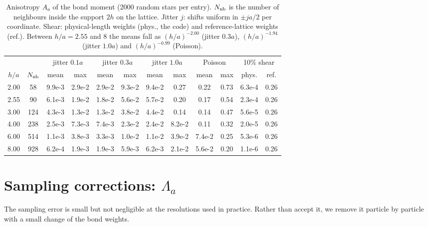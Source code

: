 \documentclass[11pt,aps,preprint,nofootinbib,superscriptaddress,tightenlines]{revtex4-2}
\begin{document}
\begin{table}[t]
\centering
\begin{tabular}{c c | c c | c c | c c | c c | c c}
\hline\hline
 & & \multicolumn{2}{c|}{jitter $0.1a$} & \multicolumn{2}{c|}{jitter $0.3a$} &
 \multicolumn{2}{c|}{jitter $1.0a$} & \multicolumn{2}{c|}{Poisson} & \multicolumn{2}{c}{10\% shear}\\
$h/a$ & $N_{\rm nb}$ & mean & max & mean & max & mean & max & mean & max & phys. & ref.\\
\hline
2.00 & 58  & 9.9e-3 & 2.9e-2 & 2.9e-2 & 9.3e-2 & 9.4e-2 & 0.27 & 0.22 & 0.73 & 6.3e-4 & 0.26\\
2.55 & 90  & 6.1e-3 & 1.9e-2 & 1.8e-2 & 5.6e-2 & 5.7e-2 & 0.20 & 0.17 & 0.54 & 2.3e-4 & 0.26\\
3.00 & 124 & 4.3e-3 & 1.3e-2 & 1.3e-2 & 3.8e-2 & 4.4e-2 & 0.14 & 0.14 & 0.47 & 5.6e-5 & 0.26\\
4.00 & 238 & 2.5e-3 & 7.3e-3 & 7.4e-3 & 2.3e-2 & 2.4e-2 & 8.2e-2 & 0.11 & 0.32 & 2.0e-5 & 0.26\\
6.00 & 514 & 1.1e-3 & 3.8e-3 & 3.3e-3 & 1.0e-2 & 1.1e-2 & 3.9e-2 & 7.4e-2 & 0.25 & 5.3e-6 & 0.26\\
8.00 & 928 & 6.2e-4 & 1.9e-3 & 1.9e-3 & 5.9e-3 & 6.2e-3 & 2.1e-2 & 5.6e-2 & 0.20 & 1.1e-6 & 0.26\\
\hline\hline
\end{tabular}
\caption{Anisotropy $A_a$ of the bond moment (2000 random stars per entry).
$N_{\rm nb}$ is the number of neighbours inside the support $2h$ on the
lattice.  Jitter $j$: shifts uniform in $\pm ja/2$ per coordinate.  Shear:
physical-length weights (phys., the code) and reference-lattice weights (ref.).  Between
$h/a=2.55$ and 8 the means fall as $(h/a)^{-2.00}$ (jitter $0.3a$),
$(h/a)^{-1.94}$ (jitter $1.0a$) and $(h/a)^{-0.99}$ (Poisson).}
\label{tab:moment}
\end{table}

\section{Sampling corrections: $\Lambda_a$}
\label{sec:Lambdacorr}

The sampling error is small but not negligible at the resolutions used in
practice.  Rather than accept it, we remove it particle by particle with a small
change of the bond weights.
\end{document}
